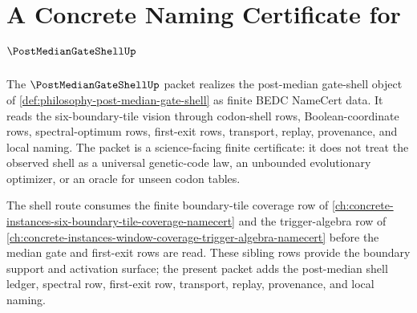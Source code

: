 \chapter{A Concrete Naming Certificate for $\PostMedianGateShellUp$}
\label{ch:concrete-instances-post-median-gate-shell-namecert}

The $\PostMedianGateShellUp$ packet realizes the post-median gate-shell object of \autoref{def:philosophy-post-median-gate-shell} as finite BEDC NameCert data. It reads the six-boundary-tile vision through codon-shell rows, Boolean-coordinate rows, spectral-optimum rows, first-exit rows, transport, replay, provenance, and local naming. The packet is a science-facing finite certificate: it does not treat the observed shell as a universal genetic-code law, an unbounded evolutionary optimizer, or an oracle for unseen codon tables.



The shell route consumes the finite boundary-tile coverage row of \autoref{ch:concrete-instances-six-boundary-tile-coverage-namecert} and the trigger-algebra row of \autoref{ch:concrete-instances-window-coverage-trigger-algebra-namecert} before the median gate and first-exit rows are read. These sibling rows provide the boundary support and activation surface; the present packet adds the post-median shell ledger, spectral row, first-exit row, transport, replay, provenance, and local naming.

